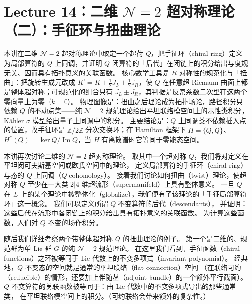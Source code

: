 \section{Lecture 14：二维 $\mathcal{N}=2$ 超对称理论（二）：手征环与扭曲理论}

\begin{keytakeaways}
本讲在二维 $\mathcal{N}=2$ 超对称理论中取定一个超荷 $Q$，把手征环（chiral ring）定义为局部算符的 $Q$ 上同调，并证明 $Q$-闭算符的「后代」在闭链上的积分给出与度规无关、因而具有拓扑意义的关联函数。
核心数学工具是 $R$ 对称性的规范化与「扭曲」：把旋转生成元改成 $K'=K\pm\frac12J_L\pm\frac12J_R$，使 $Q$ 在任意超 Riemann 曲面上都是整体超对称；可规范化的组合只有 $J_L\pm J_R$，其判据是反常系数二次型在这两个零向量上为零（$k=0$）。
物理图像是：扭曲之后理论成为拓扑场论，路径积分只依赖 $Q$ 的不动点集——纯 $\mathcal{N}=2$ 规范理论给出平坦联络模空间上的示性类积分，Kähler $\sigma$ 模型给出量子上同调中的积分。
主要结论是：$Q$ 上同调类不依赖插入点的位置，故手征环是 $\mathbb{Z}/2\mathbb{Z}$ 分次交换环；在 Hamilton 框架下 $H=\{Q,\widetilde Q\}$、$H^*(Q)=\ker Q/\operatorname{Im}Q$，当 $H$ 有离散谱时它等同于零能态空间。
\end{keytakeaways}


本讲再次讨论二维的 $\mathcal{N}=2$ 超对称理论。
取其中一个超对称 $Q$，我们将对定义在平坦闵可夫斯基空间或欧氏空间中的理论，
定义局部算符的手征环（chiral ring）与态的 $Q$ 上同调（$Q$-cohomology）。
接着我们讨论如何扭曲（twist）理论，使超对称 $Q$ 至少在一大类 $2|4$ 维超流形（supermanifold）上具有整体意义。
一旦 $Q$ 在 $\Sigma$ 上的某个理论中被整体化（globalize），我们便有了该理论的「手征局部算符环」这一概念。
我们可以定义所谓 $Q$ 不变算符的后代（descendants），
并证明：这些后代在流形中各闭链上的积分给出具有拓扑意义的关联函数。
为计算这些函数，人们对 $Q$ 不变的场作积分。

随后我们详细考察两个带整体超对称 $Q$ 的扭曲理论的例子。
第一个是二维的、规范群为单 Lie 群 $G$ 的纯 $\mathcal{N}=2$ 规范理论。
在这里我们看到，手征函数（chiral functions）之环被等同于 Lie 代数上的不变多项式（invariant polynomial）。
经典地，$Q$ 不变态的空间就是通常的平坦联络（flat connection）空间
（在联络可约（reducible）的情形，还要加上伴随丛（adjoint bundle）的一个额外平行截面）。
$Q$ 不变算符的关联函数被等同于：由 Lie 代数中的不变多项式导出的那些通常类，
在平坦联络模空间上的积分。（可约联络会带来额外的复杂性。）

